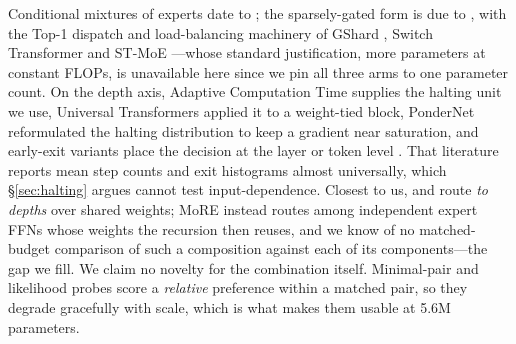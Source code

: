 Conditional mixtures of experts date to \citet{jacobs1991moe}; the sparsely-gated
form is due to \citet{shazeer2017moe}, with the Top-1 dispatch and load-balancing
machinery of GShard \citep{lepikhin2021gshard}, Switch Transformer
\citep{fedus2022switch} and ST-MoE \citep{zoph2022stmoe}---whose standard
justification, more parameters at constant FLOPs, is unavailable here since we
pin all three arms to one parameter count. On the depth axis, Adaptive
Computation Time \citep{graves2016act} supplies the halting unit we use,
Universal Transformers \citep{dehghani2019ut} applied it to a weight-tied block,
PonderNet \citep{banino2021pondernet} reformulated the halting distribution to
keep a gradient near saturation, and early-exit variants place the decision at
the layer or token level \citep{elbayad2020depthadaptive,schuster2022calm,raposo2024mod}.
That literature reports mean step counts and exit histograms almost universally,
which \S\ref{sec:halting} argues cannot test input-dependence. Closest to us,
\citet{bae2025mor} and \citet{raposo2024mod} route \emph{to depths} over shared
weights; MoRE instead routes among independent expert FFNs whose weights the
recursion then reuses, and we know of no matched-budget comparison of such a
composition against each of its components---the gap we fill. We claim no novelty
for the combination itself. Minimal-pair and likelihood probes
\citep{warstadt2020blimp,ivanova2024ewok} score a \emph{relative} preference
within a matched pair, so they degrade gracefully with scale, which is what makes
them usable at 5.6M parameters.
